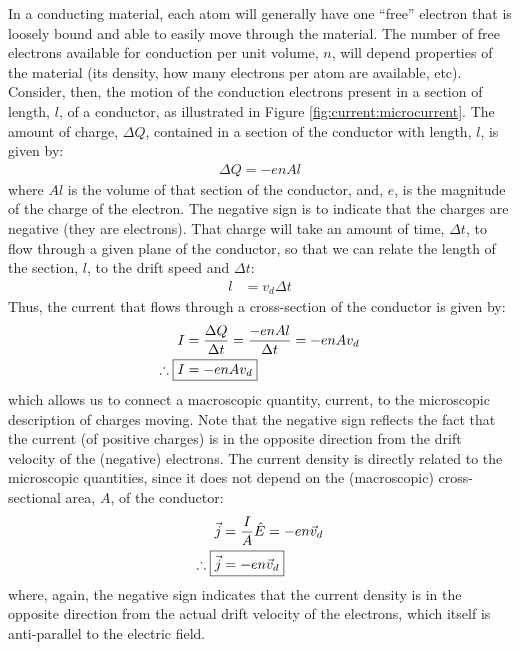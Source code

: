 In a conducting material, each atom will generally have one ``free'' electron that is loosely bound and able to easily move through the material. The number of free electrons available for conduction per unit volume, $n$, will depend properties of the material (its density, how many electrons per atom are available, etc). Consider, then, the motion of the conduction electrons present in a section of length, $l$, of a conductor, as illustrated in Figure \ref{fig:current:microcurrent}. The amount of charge, $\Delta Q$, contained in a section of the conductor with length, $l$, is given by:
\begin{align*}
\Delta Q= -e n Al
\end{align*}
where $Al$ is the volume of that section of the conductor, and, $e$, is the magnitude of the charge of the electron. The negative sign is to indicate that the charges are negative (they are electrons). That charge will take an amount of time, $\Delta t$, to flow through a given plane of the conductor, so that we can relate the length of the section, $l$, to the drift speed and $\Delta t$:
\begin{align*}
l&=v_d\Delta t
\end{align*}
Thus, the current that flows through a cross-section of the conductor is given by:
\begin{align*}
I&=\frac{\Delta Q}{\Delta t}=\frac{-e n Al}{\Delta t}=-enAv_d\\
\therefore\;\Aboxed{I&=-enAv_d}
\end{align*}
which allows us to connect a macroscopic quantity, current, to the microscopic description of charges moving. Note that the negative sign reflects the fact that the current (of positive charges) is in the opposite direction from the drift velocity of the (negative) electrons. The current density is directly related to the microscopic quantities, since it does not depend on the (macroscopic) cross-sectional area, $A$, of the conductor:
\begin{align*}
\vec j&=\frac{I}{A}\hat E = -en\vec v_d\\
\therefore\; \Aboxed{\vec j &= -en\vec v_d}
\end{align*}
where, again, the negative sign indicates that the current density is in the opposite direction from the actual drift velocity of the electrons, which itself is anti-parallel to the electric field.

